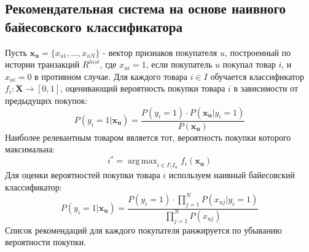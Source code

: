 \documentclass{article}
\DeclareMathOperator*{\argmax}{arg\,max}
\begin{document}
\subsection{Рекомендательная система на основе наивного байесовского классификатора}
Пусть $\mathbf{x_u} = \{x_{u1}, ..., x_{uN}\}$ - вектор признаков покупателя $u$, построенный по истории транзакций $R^{hist}$, где $x_{ui} = 1$, если покупатель $u$ покупал товар $i$, и $x_{ui} = 0$ в противном случае.
Для каждого товара $i \in I$ обучается классификатор $f_i: \mathbf{X} \rightarrow [0, 1]$, оценивающий вероятность покупки товара $i$ в зависимости от предыдущих покупок:
\begin{equation}
P(y_i = 1 | \mathbf{x_u}) = \frac{P(y_i = 1) \cdot P(\mathbf{x_u} | y_i = 1)}{P(\mathbf{x_u})}
\end{equation}
Наиболее релевантным товаром является тот, вероятность покупки которого максимальна:
\begin{equation}
i^* = \argmax_{i \in I \setminus I_u} f_i(\mathbf{x_u})
\end{equation}
Для оценки вероятностей покупки товара $i$ используем наивный байесовский классификатор:
\begin{equation}
P(y_i = 1 | \mathbf{x_u}) = \frac{P(y_i = 1) \cdot \prod_{j=1}^N P(x_{uj} | y_i = 1)}{\prod_{j=1}^N P(x_{uj})}
\end{equation}
Список рекомендаций для каждого покупателя ранжируется по убыванию вероятности покупки.
\end{document}

